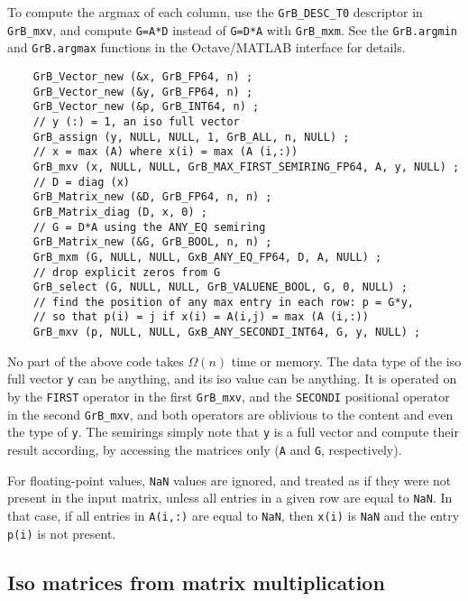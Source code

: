 \documentclass[12pt]{article}
\begin{document}
{To compute the argmax of each column, use the \verb'GrB_DESC_T0' descriptor
in \verb'GrB_mxv', and compute \verb'G=A*D' instead of \verb'G=D*A' with
\verb'GrB_mxm'.  See the \verb'GrB.argmin' and \verb'GrB.argmax' functions
in the Octave/MATLAB interface for details.


{\footnotesize
\begin{verbatim}
    GrB_Vector_new (&x, GrB_FP64, n) ;
    GrB_Vector_new (&y, GrB_FP64, n) ;
    GrB_Vector_new (&p, GrB_INT64, n) ;
    // y (:) = 1, an iso full vector
    GrB_assign (y, NULL, NULL, 1, GrB_ALL, n, NULL) ;
    // x = max (A) where x(i) = max (A (i,:))
    GrB_mxv (x, NULL, NULL, GrB_MAX_FIRST_SEMIRING_FP64, A, y, NULL) ;
    // D = diag (x)
    GrB_Matrix_new (&D, GrB_FP64, n, n) ;
    GrB_Matrix_diag (D, x, 0) ;
    // G = D*A using the ANY_EQ semiring
    GrB_Matrix_new (&G, GrB_BOOL, n, n) ;
    GrB_mxm (G, NULL, NULL, GxB_ANY_EQ_FP64, D, A, NULL) ;
    // drop explicit zeros from G
    GrB_select (G, NULL, NULL, GrB_VALUENE_BOOL, G, 0, NULL) ;
    // find the position of any max entry in each row: p = G*y,
    // so that p(i) = j if x(i) = A(i,j) = max (A (i,:))
    GrB_mxv (p, NULL, NULL, GxB_ANY_SECONDI_INT64, G, y, NULL) ; \end{verbatim}}

No part of the above code takes $\Omega(n)$ time or memory.  The data type of
the iso full vector \verb'y' can be anything, and its iso value can be
anything.  It is operated on by the \verb'FIRST' operator in the first
\verb'GrB_mxv', and the \verb'SECONDI' positional operator in the second
\verb'GrB_mxv', and both operators are oblivious to the content and even the
type of \verb'y'.  The semirings simply note that \verb'y' is a full vector and
compute their result according, by accessing the matrices only (\verb'A' and
\verb'G', respectively).

For floating-point values, \verb'NaN' values are ignored, and treated as if
they were not present in the input matrix, unless all entries in a given row
are equal to \verb'NaN'.  In that case, if all entries in \verb'A(i,:)' are
equal to \verb'NaN', then \verb'x(i)' is \verb'NaN' and the entry \verb'p(i)'
is not present.

\subsection{Iso matrices from matrix multiplication}
\label{iso_mxm}

}
\end{document}
